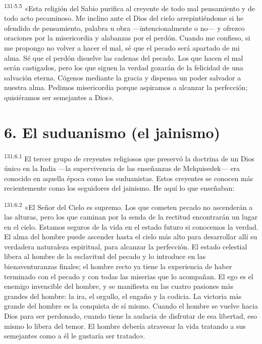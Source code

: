\par
\textsuperscript{131:5.5} «Esta religión del Sabio purifica al creyente de todo mal pensamiento y de todo acto pecaminoso. Me inclino ante el Dios del cielo arrepintiéndome si he ofendido de pensamiento, palabra u obra ---intencionalmente o no--- y ofrezco oraciones por la misericordia y alabanzas por el perdón. Cuando me confieso, si me propongo no volver a hacer el mal, sé que el pecado será apartado de mi alma. Sé que el perdón disuelve las cadenas del pecado. Los que hacen el mal serán castigados, pero los que siguen la verdad gozarán de la felicidad de una salvación eterna. Cógenos mediante la gracia y dispensa un poder salvador a nuestra alma. Pedimos misericordia porque aspiramos a alcanzar la perfección; quisiéramos ser semejantes a Dios».

\section*{6. El suduanismo (el jainismo)}
\par
\textsuperscript{131:6.1} El tercer grupo de creyentes religiosos que preservó la doctrina de un Dios único en la India ---la supervivencia de las enseñanzas de Melquisedek--- era conocido en aquella época como los suduanistas. Estos creyentes se conocen más recientemente como los seguidores del jainismo. He aquí lo que enseñaban:

\par
\textsuperscript{131:6.2} «El Señor del Cielo es supremo. Los que cometen pecado no ascenderán a las alturas, pero los que caminan por la senda de la rectitud encontrarán un lugar en el cielo. Estamos seguros de la vida en el estado futuro si conocemos la verdad. El alma del hombre puede ascender hasta el cielo más alto para desarrollar allí su verdadera naturaleza espiritual, para alcanzar la perfección. El estado celestial libera al hombre de la esclavitud del pecado y lo introduce en las bienaventuranzas finales; el hombre recto ya tiene la experiencia de haber terminado con el pecado y con todas las miserias que lo acompañan. El ego es el enemigo invencible del hombre, y se manifiesta en las cuatro pasiones más grandes del hombre: la ira, el orgullo, el engaño y la codicia. La victoria más grande del hombre es la conquista de sí mismo. Cuando el hombre se vuelve hacia Dios para ser perdonado, cuando tiene la audacia de disfrutar de esa libertad, eso mismo lo libera del temor. El hombre debería atravesar la vida tratando a sus semejantes como a él le gustaría ser tratado».

